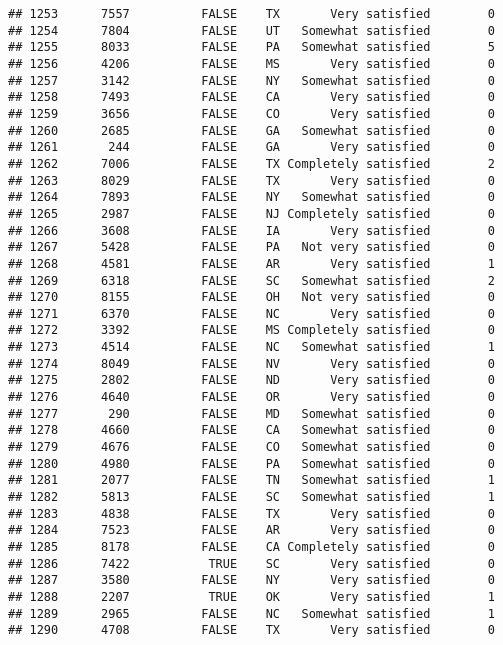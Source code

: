 \documentclass[]{book}
\theoremstyle{definition}
\theoremstyle{definition}
\theoremstyle{remark}
\begin{document}
\begin{verbatim}
## 1253      7557          FALSE    TX       Very satisfied        0
## 1254      7804          FALSE    UT   Somewhat satisfied        0
## 1255      8033          FALSE    PA   Somewhat satisfied        5
## 1256      4206          FALSE    MS       Very satisfied        0
## 1257      3142          FALSE    NY   Somewhat satisfied        0
## 1258      7493          FALSE    CA       Very satisfied        0
## 1259      3656          FALSE    CO       Very satisfied        0
## 1260      2685          FALSE    GA   Somewhat satisfied        0
## 1261       244          FALSE    GA       Very satisfied        0
## 1262      7006          FALSE    TX Completely satisfied        2
## 1263      8029          FALSE    TX       Very satisfied        0
## 1264      7893          FALSE    NY   Somewhat satisfied        0
## 1265      2987          FALSE    NJ Completely satisfied        0
## 1266      3608          FALSE    IA       Very satisfied        0
## 1267      5428          FALSE    PA   Not very satisfied        0
## 1268      4581          FALSE    AR       Very satisfied        1
## 1269      6318          FALSE    SC   Somewhat satisfied        2
## 1270      8155          FALSE    OH   Not very satisfied        0
## 1271      6370          FALSE    NC       Very satisfied        0
## 1272      3392          FALSE    MS Completely satisfied        0
## 1273      4514          FALSE    NC   Somewhat satisfied        1
## 1274      8049          FALSE    NV       Very satisfied        0
## 1275      2802          FALSE    ND       Very satisfied        0
## 1276      4640          FALSE    OR       Very satisfied        0
## 1277       290          FALSE    MD   Somewhat satisfied        0
## 1278      4660          FALSE    CA   Somewhat satisfied        0
## 1279      4676          FALSE    CO   Somewhat satisfied        0
## 1280      4980          FALSE    PA   Somewhat satisfied        0
## 1281      2077          FALSE    TN   Somewhat satisfied        1
## 1282      5813          FALSE    SC   Somewhat satisfied        1
## 1283      4838          FALSE    TX       Very satisfied        0
## 1284      7523          FALSE    AR       Very satisfied        0
## 1285      8178          FALSE    CA Completely satisfied        0
## 1286      7422           TRUE    SC       Very satisfied        0
## 1287      3580          FALSE    NY       Very satisfied        0
## 1288      2207           TRUE    OK       Very satisfied        1
## 1289      2965          FALSE    NC   Somewhat satisfied        1
## 1290      4708          FALSE    TX       Very satisfied        0

\end{verbatim}
\end{document}
